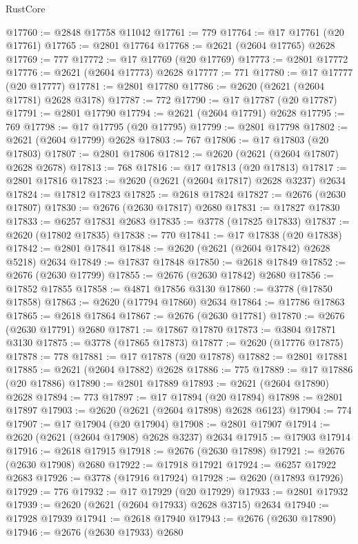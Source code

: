 \begin{lexlean}{RustCore}
\begin{coremodule}
@17760 := @2848 @17758 @11042
@17761 := 779
@17764 := @17 @17761 (@20 @17761)
@17765 := @2801 @17764
@17768 := @2621 (@2604 @17765) @2628
@17769 := 777
@17772 := @17 @17769 (@20 @17769)
@17773 := @2801 @17772
@17776 := @2621 (@2604 @17773) @2628
@17777 := 771
@17780 := @17 @17777 (@20 @17777)
@17781 := @2801 @17780
@17786 := @2620 (@2621 (@2604 @17781) @2628 @3178)
@17787 := 772
@17790 := @17 @17787 (@20 @17787)
@17791 := @2801 @17790
@17794 := @2621 (@2604 @17791) @2628
@17795 := 769
@17798 := @17 @17795 (@20 @17795)
@17799 := @2801 @17798
@17802 := @2621 (@2604 @17799) @2628
@17803 := 767
@17806 := @17 @17803 (@20 @17803)
@17807 := @2801 @17806
@17812 := @2620 (@2621 (@2604 @17807) @2628 @2678)
@17813 := 768
@17816 := @17 @17813 (@20 @17813)
@17817 := @2801 @17816
@17823 := @2620 (@2621 (@2604 @17817) @2628 @3237) @2634
@17824 := @17812 @17823
@17825 := @2618 @17824
@17827 := @2676 (@2630 @17807)
@17830 := @2676 (@2630 @17817) @2680
@17831 := @17827 @17830
@17833 := @6257 @17831 @2683
@17835 := @3778 (@17825 @17833)
@17837 := @2620 (@17802 @17835)
@17838 := 770
@17841 := @17 @17838 (@20 @17838)
@17842 := @2801 @17841
@17848 := @2620 (@2621 (@2604 @17842) @2628 @5218) @2634
@17849 := @17837 @17848
@17850 := @2618 @17849
@17852 := @2676 (@2630 @17799)
@17855 := @2676 (@2630 @17842) @2680
@17856 := @17852 @17855
@17858 := @4871 @17856 @3130
@17860 := @3778 (@17850 @17858)
@17863 := @2620 (@17794 @17860) @2634
@17864 := @17786 @17863
@17865 := @2618 @17864
@17867 := @2676 (@2630 @17781)
@17870 := @2676 (@2630 @17791) @2680
@17871 := @17867 @17870
@17873 := @3804 @17871 @3130
@17875 := @3778 (@17865 @17873)
@17877 := @2620 (@17776 @17875)
@17878 := 778
@17881 := @17 @17878 (@20 @17878)
@17882 := @2801 @17881
@17885 := @2621 (@2604 @17882) @2628
@17886 := 775
@17889 := @17 @17886 (@20 @17886)
@17890 := @2801 @17889
@17893 := @2621 (@2604 @17890) @2628
@17894 := 773
@17897 := @17 @17894 (@20 @17894)
@17898 := @2801 @17897
@17903 := @2620 (@2621 (@2604 @17898) @2628 @6123)
@17904 := 774
@17907 := @17 @17904 (@20 @17904)
@17908 := @2801 @17907
@17914 := @2620 (@2621 (@2604 @17908) @2628 @3237) @2634
@17915 := @17903 @17914
@17916 := @2618 @17915
@17918 := @2676 (@2630 @17898)
@17921 := @2676 (@2630 @17908) @2680
@17922 := @17918 @17921
@17924 := @6257 @17922 @2683
@17926 := @3778 (@17916 @17924)
@17928 := @2620 (@17893 @17926)
@17929 := 776
@17932 := @17 @17929 (@20 @17929)
@17933 := @2801 @17932
@17939 := @2620 (@2621 (@2604 @17933) @2628 @3715) @2634
@17940 := @17928 @17939
@17941 := @2618 @17940
@17943 := @2676 (@2630 @17890)
@17946 := @2676 (@2630 @17933) @2680

\end{coremodule}
\end{lexlean}
